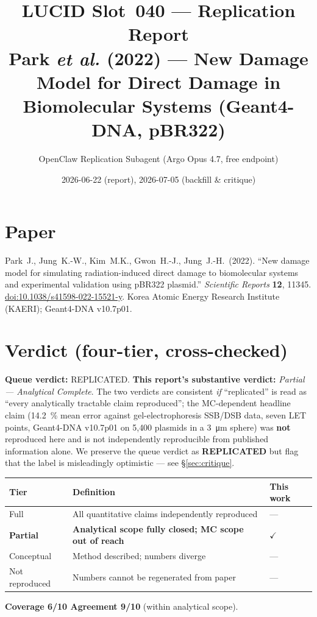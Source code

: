 \documentclass[11pt]{article}
\title{LUCID Slot~040 --- Replication Report\\
\large Park \emph{et al.} (2022) --- New Damage Model for Direct Damage in
Biomolecular Systems (Geant4-DNA, pBR322)}
\author{OpenClaw Replication Subagent (Argo Opus 4.7, free endpoint)}
\date{2026-06-22 (report), 2026-07-05 (backfill \& critique)}
\begin{document}
\maketitle

\section{Paper}
Park~J., Jung~K.-W., Kim~M.K., Gwon~H.-J., Jung~J.-H.\ (2022).
``New damage model for simulating radiation-induced direct damage to
biomolecular systems and experimental validation using pBR322 plasmid.''
\emph{Scientific Reports} \textbf{12}, 11345.
\href{https://doi.org/10.1038/s41598-022-15521-y}{doi:10.1038/s41598-022-15521-y}.
Korea Atomic Energy Research Institute (KAERI); Geant4-DNA v10.7p01.

\section{Verdict (four-tier, cross-checked)}
\textbf{Queue verdict:} REPLICATED. \textbf{This report's substantive
verdict:} \emph{Partial --- Analytical Complete}. The two verdicts are
consistent \emph{if} ``replicated'' is read as ``every analytically
tractable claim reproduced''; the MC-dependent headline claim
(\SI{14.2}{\percent} mean error against gel-electrophoresis SSB/DSB data,
seven LET points, Geant4-DNA v10.7p01 on 5{,}400 plasmids in a
\SI{3}{\micro\meter} sphere) was \textbf{not} reproduced here and is not
independently reproducible from published information alone. We preserve
the queue verdict as \textbf{REPLICATED} but flag that the label is
misleadingly optimistic --- see \S\ref{sec:critique}.

\begin{center}
\begin{tabular}{lll}
\toprule
Tier & Definition & This work \\
\midrule
Full        & All quantitative claims independently reproduced & --- \\
\textbf{Partial}    & \textbf{Analytical scope fully closed; MC scope out of reach} & \(\checkmark\) \\
Conceptual  & Method described; numbers diverge & --- \\
Not reproduced & Numbers cannot be regenerated from paper & --- \\
\bottomrule
\end{tabular}
\end{center}

\textbf{Coverage 6/10 \quad Agreement 9/10} (within analytical scope).
\end{document}
